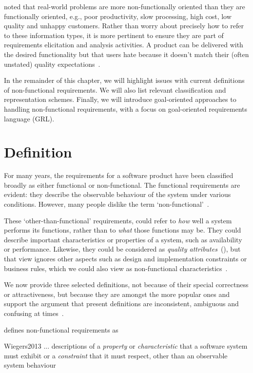 \documentclass[dissertation,final]{softeng}
\begin{document}
\citet{Chung:2009vg} noted that real-world problems are more non-functionally oriented than they are functionally oriented, e.g., poor productivity, slow processing, high cost, low quality and unhappy customers. Rather than worry about precisely how to refer to these information types, it is more pertinent to ensure they are part of requirements elicitation and analysis activities. A product can be delivered with the desired functionality but that users hate because it doesn't match their (often unstated) quality expectations~\citep{Wiegers2013}.

In the remainder of this chapter, we will highlight issues with current definitions of non-functional requirements. We will also list relevant classification and representation schemes. Finally, we will introduce goal-oriented approaches to handling non-functional requirements, with a focus on goal-oriented requirements language (GRL).

\section{Definition}
For many years, the requirements for a software product have been classified broadly as either functional or non-functional. The functional requirements are evident: they describe the observable behaviour of the system under various conditions. However, many people dislike the term `non-functional'~\citep{Wiegers2013}. 

These `other-than-functional' requirements, could refer to \emph{how} well a system performs its functions, rather than to \emph{what} those functions may be. They could describe important characteristics or properties of a system, such as availability or performance. Likewise, they could be considered as \emph{quality attributes}~(), but that view ignores other aspects such as design and implementation constraints or business rules, which we could also view as non-functional characteristics~\citep{Wiegers2013}.

We now provide three selected definitions, not because of their special correctness or attractiveness, but because they are amongst the more popular ones and support the argument that present definitions are inconsistent, ambiguous and confusing at times~\citep{Glinz:2007ehba}.

\citet{Wiegers2013} defines non-functional requirements as
\begin{displaycquote}{Wiegers2013}
... descriptions of a \emph{property} or \emph{characteristic} that a software system must exhibit or a \emph{constraint} that it must respect, other than an observable system behaviour
\end{displaycquote}
\end{document}
